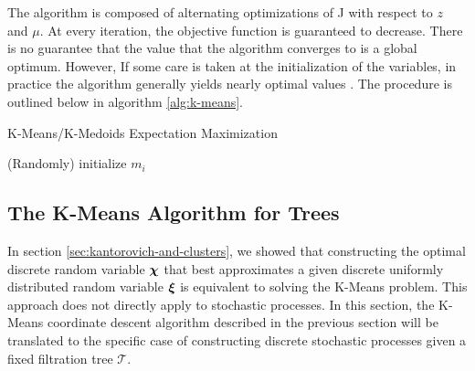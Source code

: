 The algorithm is composed of alternating optimizations of J with respect to $z$ and $\mu$.
At every iteration, the objective function is guaranteed to decrease.
There is no guarantee that the value that the algorithm converges to is a global optimum.
However, If some care is taken at the initialization of the variables, in practice the algorithm generally yields nearly optimal values \cite{Arthur2006}.
The procedure is outlined below in algorithm \ref{alg:k-means}.
\begin{algorithm}
  \label{alg:k-means}
  \caption{K-Means/K-Medoids Expectation Maximization}

  (Randomly) initialize $m_i$\;
\end{algorithm}
\subsection{The K-Means Algorithm for Trees}
\label{sec:k-means-algorithm-trees}
In section \ref{sec:kantorovich-and-clusters}, we showed that constructing the optimal discrete random variable $\boldsymbol\chi$ that best approximates a given discrete uniformly distributed random variable $\boldsymbol\xi$ is equivalent to solving the K-Means problem.
This approach does not directly apply to stochastic processes.
In this section, the K-Means coordinate descent algorithm described in the previous section will be translated to the specific case of constructing discrete stochastic processes given a fixed filtration tree $\mathcal{T}$.
